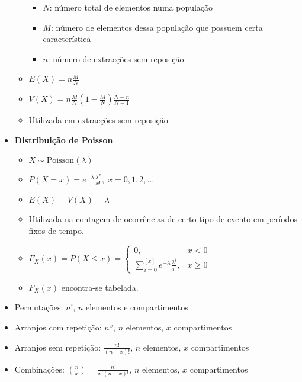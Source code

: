 \documentclass[a4paper]{report}
\newcommand{\bld}{\textbf}
\begin{document}
\begin{itemize}
\begin{itemize}
			\begin{itemize}
				\item $N$: número total de elementos numa população
				\item $M$: número de elementos dessa população que possuem certa característica
				\item $n$: número de extracções sem reposição
			\end{itemize}
			\item $E(X)=n\frac M N$
			\item $V(X)=n\frac M N \left(1-\frac M N\right)\frac{N-n}{N-1}$
			\item Utilizada em extracções sem reposição
		\end{itemize}
		\item {\large \bld{Distribuição de Poisson}}
		\begin{itemize}
			\item $X\sim\text{Poisson}(\lambda)$
			\item $P(X=x)=e^{-\lambda}\frac{\lambda^x}{x!},\;x=0,1,2,\ldots$
			\item $E(X)=V(X)=\lambda$
			\item Utilizada na contagem de ocorrências de certo tipo de evento em períodos fixos de tempo.
			\item $F_X(x)=P(X\leq x)=\begin{cases}
			0,&x<0\\
			\sum_{i=0}^{[x]}e^{-\lambda}\frac{\lambda^i}{i!},&x\geq 0
			\end{cases}$
			\item $F_X(x)$ encontra-se tabelada.
		\end{itemize}
		\item Permutações: $n!$, $n$ elementos e compartimentos
		\item Arranjos com repetição: $n^x$, $n$ elementos, $x$ compartimentos
		\item Arranjos sem repetição: $\frac{n!}{(n-x)!}$, $n$ elementos, $x$ compartimentos
		\item Combinações: $\binom n x=\frac{n!}{x!(n-x)!}$, $n$ elementos, $x$ compartimentos
	\end{itemize}
\end{document}
